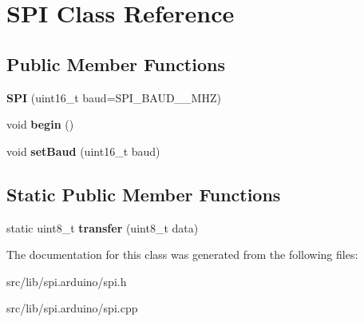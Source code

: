 \hypertarget{class_s_p_i}{\section{S\-P\-I Class Reference}
\label{class_s_p_i}
}
\subsection*{Public Member Functions}
\begin{DoxyCompactItemize}
\item 
\hypertarget{class_s_p_i_a11d75df5958b0a1411a833699df15420}{{\bfseries S\-P\-I} (uint16\-\_\-t baud=S\-P\-I\-\_\-\-B\-A\-U\-D\-\_\-\_\-\-M\-H\-Z)}\label{class_s_p_i_a11d75df5958b0a1411a833699df15420}

\item 
\hypertarget{class_s_p_i_ab0bdf5cca484fb2ba637c39384b27fb2}{void {\bfseries begin} ()}\label{class_s_p_i_ab0bdf5cca484fb2ba637c39384b27fb2}

\item 
\hypertarget{class_s_p_i_a75a939033954ae6be8d1ab7c2b9804a2}{void {\bfseries set\-Baud} (uint16\-\_\-t baud)}\label{class_s_p_i_a75a939033954ae6be8d1ab7c2b9804a2}

\end{DoxyCompactItemize}
\subsection*{Static Public Member Functions}
\begin{DoxyCompactItemize}
\item 
\hypertarget{class_s_p_i_abea61bd533e1eb1faba719741911ccd7}{static uint8\-\_\-t {\bfseries transfer} (uint8\-\_\-t data)}\label{class_s_p_i_abea61bd533e1eb1faba719741911ccd7}

\end{DoxyCompactItemize}


The documentation for this class was generated from the following files\-:\begin{DoxyCompactItemize}
\item 
src/lib/spi.\-arduino/spi.\-h\item 
src/lib/spi.\-arduino/spi.\-cpp\end{DoxyCompactItemize}
